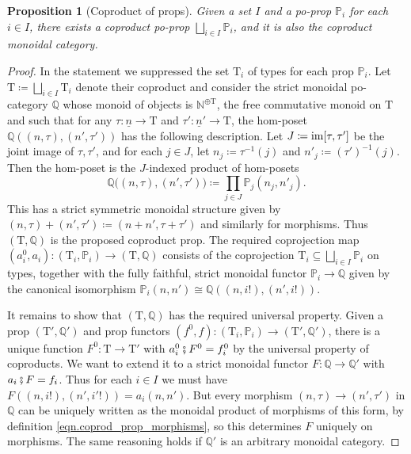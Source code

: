 \documentclass[11pt, oneside, article]{memoir}
\theoremstyle{plain}
\newtheorem{proposition}[theorem]{Proposition}
\theoremstyle{definition}
\theoremstyle{remark}
\newcommand{\Set}[1]{\mathrm{#1}}%
\newcommand{\ord}[1]{\underline{#1}}%
\newcommand{\ccat}[1]{\mathbb{#1}}%
\DeclareMathOperator{\im}{im}
\DeclarePairedDelimiter{\copair}{[}{]}
\newcommand{\inv}{^{-1}}
\newcommand{\nn}{\mathbb{N}}
\newcommand{\pp}{\mathbb{P}}
\newcommand{\qq}{\mathbb{Q}}
\newcommand{\cp}{\mathbin{\fatsemi}}
\renewcommand{\ss}{\subseteq}
\newcommand{\types}{\Set{T}}
\begin{document}
\begin{proposition}[Coproduct of props]\label{prop.prop_coprod}
Given a set $I$ and a po-prop $\pp_i$ for each $i\in I$, there exists a coproduct po-prop $\bigsqcup_{i\in I}\pp_i$, and it is also the  coproduct monoidal category.
\end{proposition}
\begin{proof}
In the statement we suppressed the set $\types_i$ of types for each prop $\pp_i$. Let $\types\coloneqq\bigsqcup_{i\in I}\types_i$ denote their coproduct and consider the strict monoidal po-category $\ccat{Q}$ whose monoid of objects is $\nn^{\oplus \types}$, the free commutative monoid on $\types$ and such that for any $\tau\colon\ord{n}\to\types$ and $\tau'\colon\ord{n}'\to\types$, the hom-poset $\ccat{Q}((n,\tau),(n',\tau'))$ has the following description. Let $J\coloneqq\im\copair{\tau,\tau'}$ be the joint image of $\tau,\tau'$, and for each $j\in J$, let $n_j\coloneqq\tau\inv(j)$ and $n'_j\coloneqq(\tau')\inv(j)$. Then the hom-poset is the $J$-indexed product of hom-posets
\begin{equation}\label{eqn.coprod_prop_morphisms}
\ccat{Q}\big((n,\tau),(n',\tau')\big)\coloneqq\prod_{j\in J}\pp_j(n_j,n'_j).
\end{equation}
This has a strict symmetric monoidal structure given by $(n,\tau)+(n',\tau')\coloneqq(n+n',\tau+\tau')$ and similarly for morphisms. Thus $(\types,\qq)$ is the proposed coproduct prop. The required coprojection map $(a_i^0,a_i)\colon (\types_i,\pp_i)\to(\types,\qq)$ consists of the coprojection $\types_i\ss\bigsqcup_{i\in I}\pp_i$ on types, together with the fully faithful, strict monoidal functor $\pp_i\to\qq$ given by the canonical isomorphism $\pp_i(n,n')\cong\qq((n,i!),(n',i!))$.

It remains to show that $(\types,\qq)$ has the required universal property. Given a prop $(\types',\qq')$ and prop functors $(f^0,f)\colon(\types_i,\pp_i)\to(\types',\qq')$, there is a unique function $F^0\colon\types\to\types'$ with $a^0_i\cp F^0=f^0_i$ by the universal property of coproducts. We want to extend it to a strict monoidal functor $F\colon \qq\to\qq'$ with $a_i\cp F=f_i$. Thus for each $i\in I$ we must have $F((n,i!),(n',i'!))=a_i(n,n')$. But every morphism $(n,\tau)\to(n',\tau')$ in $\qq$ can be uniquely written as the monoidal product of morphisms of this form, by definition \eqref{eqn.coprod_prop_morphisms}, so this determines $F$ uniquely on morphisms. The same reasoning holds if $\qq'$ is an arbitrary monoidal category.
\end{proof}
\end{document}
